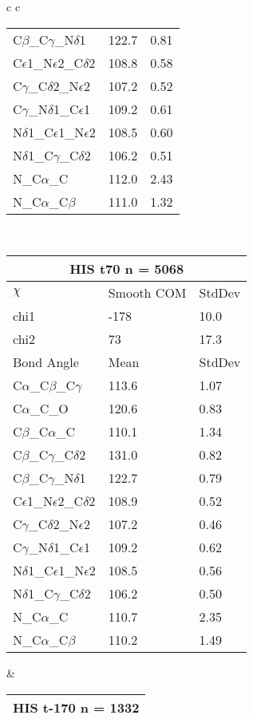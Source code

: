 \begin{longtable}{ c c }
\begin{tabular}{ l l l }
  C$\beta$\_C$\gamma$\_N$\delta$1 & 122.7 & 0.81\\
  C$\epsilon$1\_N$\epsilon$2\_C$\delta$2 & 108.8 & 0.58\\
  C$\gamma$\_C$\delta$2\_N$\epsilon$2 & 107.2 & 0.52\\
  C$\gamma$\_N$\delta$1\_C$\epsilon$1 & 109.2 & 0.61\\
  N$\delta$1\_C$\epsilon$1\_N$\epsilon$2 & 108.5 & 0.60\\
  N$\delta$1\_C$\gamma$\_C$\delta$2 & 106.2 & 0.51\\
  N\_C$\alpha$\_C & 112.0 & 2.43\\
  N\_C$\alpha$\_C$\beta$ & 111.0 & 1.32\\
  \bottomrule
  \end{tabular}
  \\
  \begin{tabular}{ l l l }
  \toprule
  \multicolumn{3}{c}{HIS \textbf{t70} n = 5068} \\ \toprule
  $\chi$       & Smooth COM & StdDev \\ \midrule
  chi1 & -178 & 10.0 \\ 
  chi2 & 73 & 17.3 \\ \midrule
  Bond Angle   & Mean     & StdDev \\ \midrule
  C$\alpha$\_C$\beta$\_C$\gamma$ & 113.6 & 1.07\\
  C$\alpha$\_C\_O & 120.6 & 0.83\\
  C$\beta$\_C$\alpha$\_C & 110.1 & 1.34\\
  C$\beta$\_C$\gamma$\_C$\delta$2 & 131.0 & 0.82\\
  C$\beta$\_C$\gamma$\_N$\delta$1 & 122.7 & 0.79\\
  C$\epsilon$1\_N$\epsilon$2\_C$\delta$2 & 108.9 & 0.52\\
  C$\gamma$\_C$\delta$2\_N$\epsilon$2 & 107.2 & 0.46\\
  C$\gamma$\_N$\delta$1\_C$\epsilon$1 & 109.2 & 0.62\\
  N$\delta$1\_C$\epsilon$1\_N$\epsilon$2 & 108.5 & 0.56\\
  N$\delta$1\_C$\gamma$\_C$\delta$2 & 106.2 & 0.50\\
  N\_C$\alpha$\_C & 110.7 & 2.35\\
  N\_C$\alpha$\_C$\beta$ & 110.2 & 1.49\\
  \bottomrule
  \end{tabular}
  &
  \begin{tabular}{ l l l }
  \toprule
  \multicolumn{3}{c}{HIS \textbf{t-170} n = 1332} \\ \toprule

\end{tabular}
\end{longtable}
